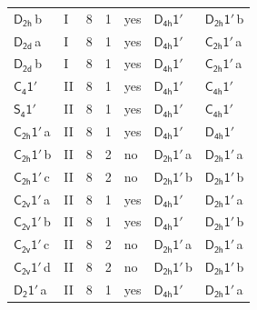 \documentclass[10pt,a4paper]{article}
\numberwithin{equation}{section}
\newcommand{\grp}[1]{\mathsf{#1}}
\newcommand{\clsletter}[1]{\,{\scriptsize\color{black!55}#1}}
\begin{document}
{\begin{longtable}{@{}llrrlll@{}}
\href{../../../rotation/data/pdf/D2h.pdf}{$\grp{D_{2h}}$}\clsletter{b} & I & 8 & 1 & yes & \href{D4h-1p.pdf}{$\grp{D_{4h}1'}$} & \href{D2h-1p.pdf}{$\grp{D_{2h}1'}$}\clsletter{b}\\
\href{../../../rotation/data/pdf/D2d.pdf}{$\grp{D_{2d}}$}\clsletter{a} & I & 8 & 1 & yes & \href{D4h-1p.pdf}{$\grp{D_{4h}1'}$} & \href{C2h-1p.pdf}{$\grp{C_{2h}1'}$}\clsletter{a}\\
\href{../../../rotation/data/pdf/D2d.pdf}{$\grp{D_{2d}}$}\clsletter{b} & I & 8 & 1 & yes & \href{D4h-1p.pdf}{$\grp{D_{4h}1'}$} & \href{C2h-1p.pdf}{$\grp{C_{2h}1'}$}\clsletter{a}\\
\href{C4-1p.pdf}{$\grp{C_{4}1'}$} & II & 8 & 1 & yes & \href{D4h-1p.pdf}{$\grp{D_{4h}1'}$} & \href{C4h-1p.pdf}{$\grp{C_{4h}1'}$}\\
\href{S4-1p.pdf}{$\grp{S_{4}1'}$} & II & 8 & 1 & yes & \href{D4h-1p.pdf}{$\grp{D_{4h}1'}$} & \href{C4h-1p.pdf}{$\grp{C_{4h}1'}$}\\
\href{C2h-1p.pdf}{$\grp{C_{2h}1'}$}\clsletter{a} & II & 8 & 1 & yes & \href{D4h-1p.pdf}{$\grp{D_{4h}1'}$} & \href{D4h-1p.pdf}{$\grp{D_{4h}1'}$}\\
\href{C2h-1p.pdf}{$\grp{C_{2h}1'}$}\clsletter{b} & II & 8 & 2 & no & \href{D2h-1p.pdf}{$\grp{D_{2h}1'}$}\clsletter{a} & \href{D2h-1p.pdf}{$\grp{D_{2h}1'}$}\clsletter{a}\\
\href{C2h-1p.pdf}{$\grp{C_{2h}1'}$}\clsletter{c} & II & 8 & 2 & no & \href{D2h-1p.pdf}{$\grp{D_{2h}1'}$}\clsletter{b} & \href{D2h-1p.pdf}{$\grp{D_{2h}1'}$}\clsletter{b}\\
\href{C2v-1p.pdf}{$\grp{C_{2v}1'}$}\clsletter{a} & II & 8 & 1 & yes & \href{D4h-1p.pdf}{$\grp{D_{4h}1'}$} & \href{D2h-1p.pdf}{$\grp{D_{2h}1'}$}\clsletter{a}\\
\href{C2v-1p.pdf}{$\grp{C_{2v}1'}$}\clsletter{b} & II & 8 & 1 & yes & \href{D4h-1p.pdf}{$\grp{D_{4h}1'}$} & \href{D2h-1p.pdf}{$\grp{D_{2h}1'}$}\clsletter{b}\\
\href{C2v-1p.pdf}{$\grp{C_{2v}1'}$}\clsletter{c} & II & 8 & 2 & no & \href{D2h-1p.pdf}{$\grp{D_{2h}1'}$}\clsletter{a} & \href{D2h-1p.pdf}{$\grp{D_{2h}1'}$}\clsletter{a}\\
\href{C2v-1p.pdf}{$\grp{C_{2v}1'}$}\clsletter{d} & II & 8 & 2 & no & \href{D2h-1p.pdf}{$\grp{D_{2h}1'}$}\clsletter{b} & \href{D2h-1p.pdf}{$\grp{D_{2h}1'}$}\clsletter{b}\\
\href{D2-1p.pdf}{$\grp{D_{2}1'}$}\clsletter{a} & II & 8 & 1 & yes & \href{D4h-1p.pdf}{$\grp{D_{4h}1'}$} & \href{D2h-1p.pdf}{$\grp{D_{2h}1'}$}\clsletter{a}\\

\end{longtable}}
\end{document}
